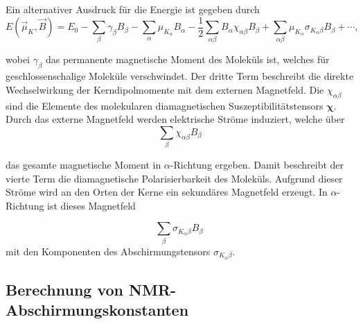 Ein alternativer Ausdruck für die Energie ist gegeben durch
\begin{equation}\label{eq:evonbmu}
 E(\vec{\mu}_K,\vec{B})=E_0-\sum_\beta \gamma_\beta B_\beta-\sum_{\alpha}\mu_{K_\alpha}B_\alpha-\frac{1}{2}\sum_{\alpha\beta}B_\alpha\chi_{\alpha\beta} B_\beta+\sum_{\alpha\beta}\mu_{K_\alpha}\sigma_{K_\alpha \beta}B_\beta+\cdots, 
\end{equation}

wobei $\gamma_\beta$ das permanente magnetische Moment des Moleküls ist, welches für geschlossenschalige Moleküle verschwindet. Der dritte Term beschreibt die direkte Wechselwirkung der Kerndipolmomente mit dem externen Magnetfeld. Die $\chi_{\alpha\beta}$ sind die Elemente des molekularen diamagnetischen Suszeptibilitätstensors $\boldsymbol{\chi}$. Durch das externe Magnetfeld werden elektrische Ströme induziert, welche über 
\begin{equation}
\sum_{\beta}\chi_{\alpha\beta} B_\beta
\end{equation} 

das gesamte magnetische Moment in $\alpha$-Richtung ergeben. Damit beschreibt der vierte Term die diamagnetische Polarisierbarkeit des Moleküls. Aufgrund dieser Ströme wird an den Orten der Kerne ein sekundäres Magnetfeld erzeugt. In $\alpha$-Richtung ist dieses Magnetfeld

\begin{equation}\label{eq:sekbfeld}
\sum_{\beta}\sigma_{K_\alpha\beta} B_\beta\, 
\end{equation}
mit den Komponenten des Abschirmungstensors $\sigma_{K_\alpha\beta}$.

%

	\subsection{Berechnung von NMR-Abschirmungskonstanten}\label{theo:nmr}
	
